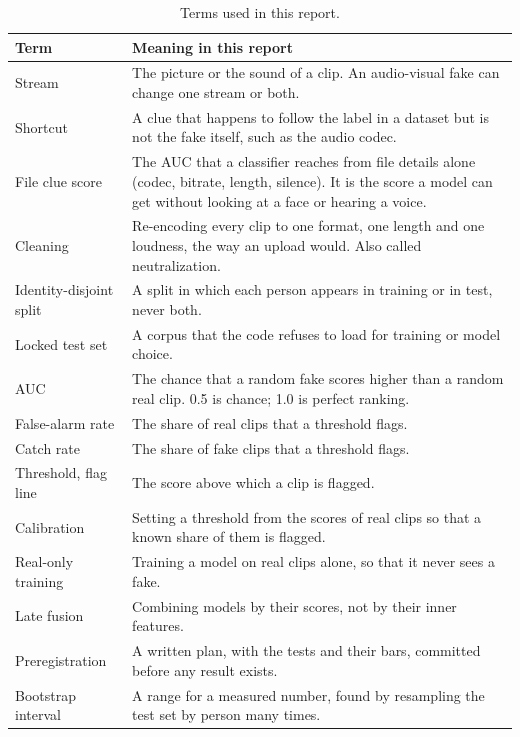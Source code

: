 \begin{table}[ht]
    \centering
    \small
    \caption{Terms used in this report.}
    \label{tab:terms}
    \begin{tabularx}{\textwidth}{@{}>{\raggedright\arraybackslash}p{3.6cm} >{\raggedright\arraybackslash}X@{}}
        \toprule
        \textbf{Term} & \textbf{Meaning in this report} \\
        \midrule
        Stream & The picture or the sound of a clip. An audio-visual fake can change one stream or both. \\
        Shortcut & A clue that happens to follow the label in a dataset but is not the fake itself, such as the audio codec. \\
        File clue score & The AUC that a classifier reaches from file details alone (codec, bitrate, length, silence). It is the score a model can get without looking at a face or hearing a voice. \\
        Cleaning & Re-encoding every clip to one format, one length and one loudness, the way an upload would. Also called neutralization. \\
        Identity-disjoint split & A split in which each person appears in training or in test, never both. \\
        Locked test set & A corpus that the code refuses to load for training or model choice. \\
        AUC & The chance that a random fake scores higher than a random real clip. 0.5 is chance; 1.0 is perfect ranking. \\
        False-alarm rate & The share of real clips that a threshold flags. \\
        Catch rate & The share of fake clips that a threshold flags. \\
        Threshold, flag line & The score above which a clip is flagged. \\
        Calibration & Setting a threshold from the scores of real clips so that a known share of them is flagged. \\
        Real-only training & Training a model on real clips alone, so that it never sees a fake. \\
        Late fusion & Combining models by their scores, not by their inner features. \\
        Preregistration & A written plan, with the tests and their bars, committed before any result exists. \\
        Bootstrap interval & A range for a measured number, found by resampling the test set by person many times. \\
        \bottomrule
    \end{tabularx}
\end{table}

